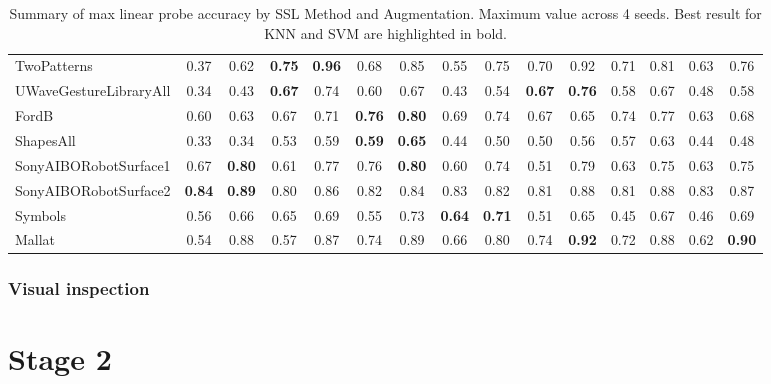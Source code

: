 \documentclass[../../thesis.tex]{subfiles}
\begin{document}
\begin{table}[h!]
\begin{adjustbox}{width=\textwidth}
\begin{tabular}{lcc|cc|cc|cc|cc|cc|cc}
        TwoPatterns             & 0.37 & 0.62 & \textbf{0.75} & \textbf{0.96} & 0.68 & 0.85 & 0.55 & 0.75 & 0.70 & 0.92 & 0.71 & 0.81 & 0.63 & 0.76 \\
        UWaveGestureLibraryAll  & 0.34 & 0.43 & \textbf{0.67} & 0.74 & 0.60 & 0.67 & 0.43 & 0.54 & \textbf{0.67} & \textbf{0.76} & 0.58 & 0.67 & 0.48 & 0.58 \\
        FordB                   & 0.60 & 0.63 & 0.67 & 0.71 & \textbf{0.76} & \textbf{0.80} & 0.69 & 0.74 & 0.67 & 0.65 & 0.74 & 0.77 & 0.63 & 0.68 \\
        ShapesAll               & 0.33 & 0.34 & 0.53 & 0.59 & \textbf{0.59} & \textbf{0.65} & 0.44 & 0.50 & 0.50 & 0.56 & 0.57 & 0.63 & 0.44 & 0.48 \\
        SonyAIBORobotSurface1   & 0.67 & \textbf{0.80} & 0.61 & 0.77 & 0.76 & \textbf{0.80} & 0.60 & 0.74 & 0.51 & 0.79 & 0.63 & 0.75 & 0.63 & 0.75 \\
        SonyAIBORobotSurface2   & \textbf{0.84} & \textbf{0.89} & 0.80 & 0.86 & 0.82 & 0.84 & 0.83 & 0.82 & 0.81 & 0.88 & 0.81 & 0.88 & 0.83 & 0.87 \\
        Symbols                 & 0.56 & 0.66 & 0.65 & 0.69 & 0.55 & 0.73 & \textbf{0.64} & \textbf{0.71} & 0.51 & 0.65 & 0.45 & 0.67 & 0.46 & 0.69 \\
        Mallat                  & 0.54 & 0.88 & 0.57 & 0.87 & 0.74 & 0.89 & 0.66 & 0.80 & 0.74 & \textbf{0.92} & 0.72 & 0.88 & 0.62 & \textbf{0.90} \\


        \bottomrule
    \end{tabular}
    \end{adjustbox}
    
    \caption{Summary of max linear probe accuracy by SSL Method and Augmentation. Maximum value across 4 seeds. Best result for KNN and SVM are highlighted in bold.}
\end{table}



\subsubsection{Visual inspection}





\section{Stage 2}
\end{document}
